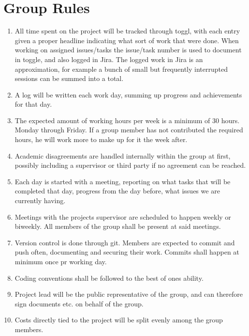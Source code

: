 \documentclass{article}
\begin{document}
\section*{Group Rules}

\begin{enumerate}
    \item
        All time spent on the project will be tracked through toggl, with each entry given a proper headline indicating what sort of work that were done.
        When working on assigned issues/tasks the issue/task number is used to document in toggle, and also logged in Jira. 
        The logged work in Jira is an approximation, for example a bunch of small but frequently interrupted sessions can be summed into a total.
    
    \item
        A log will be written each work day, summing up progress and achievements for that day.
    
    \item 
        The expected amount of working hours per week is a minimum of 30 hours. 
        Monday through Friday. 
        If a group member has not contributed the required hours, he will work more to make up for it the week after.

    \item
        Academic disagreements are handled internally within the group at first, possibly including a supervisor or third party if no agreement can be reached.
    
    \item 
        Each day is started with a meeting, reporting on what tasks that will be completed that day, progress from the day before, what issues we are currently having. 
    
    \item 
        Meetings with the projects supervisor are scheduled to happen weekly or biweekly.
        All members of the group shall be present at said meetings.
    
    \item 
        Version control is done through git. Members are expected to commit and push often, documenting and securing their work.
        Commits shall happen at minimum once pr working day.
             
    \item 
        Coding conventions shall be followed to the best of ones ability.

    \item
        Project lead will be the public representative of the group, and can therefore sign documents etc. on behalf of the group.

    \item
        Costs directly tied to the project will be split evenly among the group members.
\end{enumerate}
\end{document}
